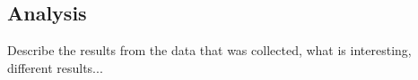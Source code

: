 \subsection{Analysis}
Describe the results from the data that was collected, what is interesting, different results...